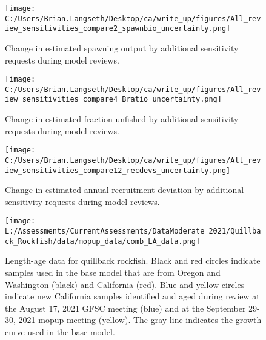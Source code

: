 \documentclass[11pt,
  english,
  a4paper,
]{article}
\begin{document}
\begin{figure}
\centering
\texttt{[image: C:/Users/Brian.Langseth/Desktop/ca/write\_up/figures/All\_review\_sensitivities\_compare2\_spawnbio\_uncertainty.png]}
\caption{Change in estimated spawning output by additional sensitivity requests during model reviews.\label{fig:review-sens-ssb}}
\end{figure}

\tagmcend\tagstructend


\begin{figure}
\centering
\texttt{[image: C:/Users/Brian.Langseth/Desktop/ca/write\_up/figures/All\_review\_sensitivities\_compare4\_Bratio\_uncertainty.png]}
\caption{Change in estimated fraction unfished by additional sensitivity requests during model reviews.\label{fig:review-sens-depl}}
\end{figure}

\tagmcend\tagstructend


\begin{figure}
\centering
\texttt{[image: C:/Users/Brian.Langseth/Desktop/ca/write\_up/figures/All\_review\_sensitivities\_compare12\_recdevs\_uncertainty.png]}
\caption{Change in estimated annual recruitment deviation by additional sensitivity requests during model reviews.\label{fig:review-sens-recdev}}
\end{figure}

\tagmcend\tagstructend


\begin{figure}
\centering
\texttt{[image: L:/Assessments/CurrentAssessments/DataModerate\_2021/Quillback\_Rockfish/data/mopup\_data/comb\_LA\_data.png]}
\caption{Length-age data for quillback rockfish. Black and red circles indicate samples used in the base model that are from Oregon and Washington (black) and California (red). Blue and yellow circles indicate new California samples identified and aged during review at the August 17, 2021 GFSC meeting (blue) and at the September 29-30, 2021 mopup meeting (yellow). The gray line indicates the growth curve used in the base model.\label{fig:review-length-age}}
\end{figure}
\end{document}
